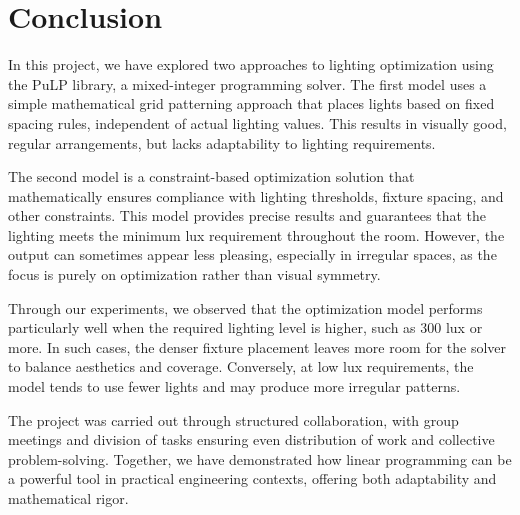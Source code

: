 \documentclass{article}
\begin{document}
\section{Conclusion}

In this project, we have explored two approaches to lighting optimization using the PuLP library, a mixed-integer programming solver.
The first model uses a simple mathematical grid patterning approach that places lights based on fixed spacing rules, independent of actual lighting values.
This results in visually good, regular arrangements, but lacks adaptability to lighting requirements.

The second model is a constraint-based optimization solution that mathematically ensures compliance with lighting thresholds,
fixture spacing, and other constraints. This model provides precise results and guarantees that the lighting meets the minimum lux requirement
throughout the room. However, the output can sometimes appear less pleasing, especially in irregular spaces, as the focus is purely on optimization rather than visual symmetry.

Through our experiments, we observed that the optimization model performs particularly well when the required lighting level is higher,
such as 300 lux or more. In such cases, the denser fixture placement leaves more room for the solver to balance aesthetics and coverage.
Conversely, at low lux requirements, the model tends to use fewer lights and may produce more irregular patterns.

The project was carried out through structured collaboration, with group meetings and division of tasks ensuring even distribution of work 
and collective problem-solving. Together, we have demonstrated how linear programming can be a powerful tool
in practical engineering contexts, offering both adaptability and mathematical rigor.
\end{document}
